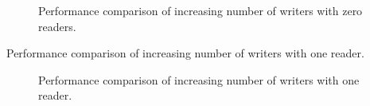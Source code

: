 \documentclass{article}
\begin{document}
\begin{figure}[tph]
\begin{center}
\caption{Performance comparison of increasing number of writers with zero readers.}
\label{img:micro_0r_vw}
\end{center}
\end{figure}

\begin{table}[tph]
\begin{center}

\end{center}
\label{tbl:micro_1r_vw}
\caption{Performance comparison of increasing number of writers with one reader.}
\end{table}

\begin{figure}[tph]
\begin{center}
\caption{Performance comparison of increasing number of writers with one reader.}
\label{img:micro_1r_vw}
\end{center}
\end{figure}
\end{document}
